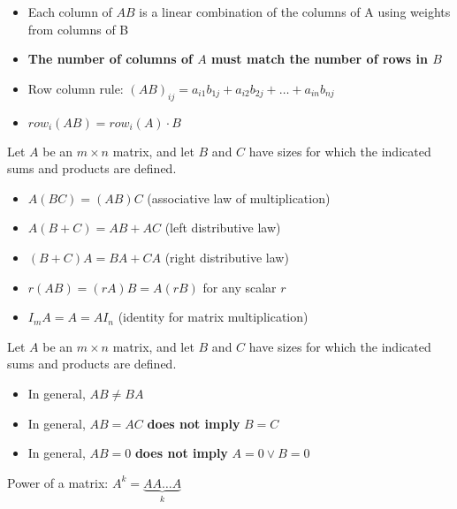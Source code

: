 \documentclass{report}
\begin{document}
\begin{itemize}
\item Each column of $AB$ is a linear combination of the columns of A using weights from columns of B
\item \textbf{The number of columns of $A$ must match the number of rows in $B$ }
\item Row column rule: $(AB)_{ij} = a_{i1}b_{1j} + a_{i2}b_{2j} + \ldots + a_{in}b_{nj}$
\item $row_i(AB) = row_i(A)\cdot B$
\end{itemize}

\begin{theorem}
\end{theorem}
\begin{tcolorbox}[colback=blue!5!white, colframe=blue!75!black, title=Properties of Matrices]
Let $A$ be an $m \times n$ matrix, and let $B$ and $C$ have sizes for which the indicated sums and products are defined.

\begin{itemize}
    \item[] $A(BC) = (AB)C$ \hfill (associative law of multiplication)
    \item[] $A(B + C) = AB + AC$ \hfill (left distributive law)
    \item[] $(B + C)A = BA + CA$ \hfill (right distributive law)
    \item[] $r(AB) = (rA)B = A(rB)$ for any scalar $r$
    \item[] $I_m A = A = A I_n$ \hfill (identity for matrix multiplication)
\end{itemize}
\end{tcolorbox}

\begin{tcolorbox}[colback=blue!5!white, colframe=red!75!black, title=WARNING]
Let $A$ be an $m \times n$ matrix, and let $B$ and $C$ have sizes for which the indicated sums and products are defined.

\begin{itemize}
    \item In general, $AB \ne BA$
    \item In general, $AB = AC$ \textbf{does not imply} $B = C$
    \item In general, $AB = 0$ \textbf{does not imply} $A = 0 \vee B = 0$
\end{itemize}
\end{tcolorbox}

Power of a matrix: $A^k = \underbrace{A A \dots A}_{k}$ \\
\end{document}
